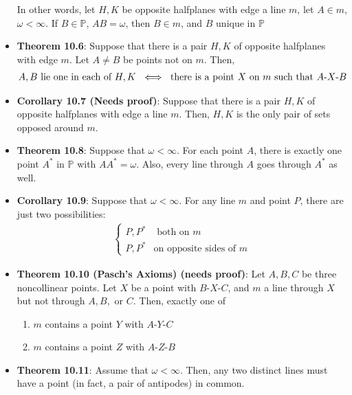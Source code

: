 \documentclass{report}
\begin{document}
\begin{itemize}
            \bigbreak \noindent 
            In other words, let $H,K$ be opposite halfplanes with edge a line $m$, let $A \in m$, $\omega < \infty$. If $B \in \mathbb{P}$, $AB = \omega$, then $B \in m$, and $B$ unique in $\mathbb{P}$
        \item \textbf{Theorem 10.6}: Suppose that there is a pair $H,K$ of opposite halfplanes with edge $m$. Let $A \ne B$ be points not on $m$. Then, 
            \begin{align*}
                A,B \text{ lie one in each of $H,K$ } \iff \text{ there is a point $X$ on $m$ such that $ A\text{-}X\text{-}B $}
            \end{align*}
        \item \textbf{Corollary 10.7 (Needs proof)}: Suppose that there is a pair $H,K$ of opposite halfplanes with edge a line $m$. Then, $H,K$ is the only pair of sets opposed around $m$.
        \item \textbf{Theorem 10.8}: Suppose that $\omega < \infty$. For each point $ A$, there is exactly one point $A^{*}$ in $\mathbb{P}$ with $AA^{*} = \omega$. Also, every line through $A$ goes through $A^{*}$ as well.
        \item \textbf{Corollary 10.9}: Suppose that $\omega < \infty$. For any line $m$ and point $P$, there are just two possibilities:
            \begin{align*}
               \begin{cases}
                   P,P^{*} &\text{ both on $m$}     \\
                   P, P^{*} &\text{on opposite sides of $m$}
               \end{cases}
            \end{align*}

        \item \textbf{Theorem 10.10 (Pasch's Axioms) (needs proof)}: Let $A,B,C$ be three noncollinear points. Let $X$ be a point with $ B\text{-}X\text{-}C $, and $m$ a line through $X$ but not through $A,B,$ or $C$. Then, exactly one of
            \begin{enumerate}
                \item $m$ contains a point $Y$ with $ A\text{-}Y\text{-}C$
                \item $m$ contains a point $Z$ with $ A\text{-}Z\text{-}B $
            \end{enumerate}
        \item \textbf{Theorem 10.11}: Assume that $\omega < \infty$. Then, any two distinct lines must have a point (in fact, a pair of antipodes) in common.


    \end{itemize}
\end{document}
